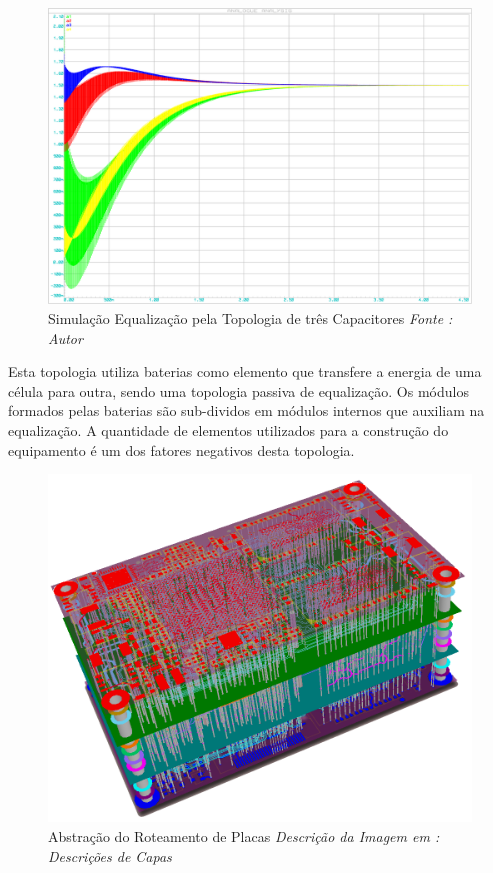 \documentclass[11pt, a4paper, oneside]{article}
\begin{document}
\begin{figure}[h!]
\centering
\includegraphics[width=1\linewidth]{diversos_capacitores}
\caption{Simulação Equalização pela Topologia de três Capacitores \textit{Fonte : Autor}}
\label{fig:estrutura_equalizador_passivo_ apacitor}
\end{figure}

Esta topologia utiliza baterias como elemento que transfere a energia de
uma célula para outra, sendo uma topologia passiva de equalização. Os módulos
formados pelas baterias são sub-dividos em módulos internos que auxiliam na
equalização. A quantidade de elementos utilizados para a construção do
equipamento é um dos fatores negativos desta topologia.

 	\newpage
	\thispagestyle{empty}
	\clearpage
	\begin{figure}
		\centering
		\includegraphics[width=1\linewidth]{capa5.png}
		\caption{Abstração do Roteamento de Placas \textit{Descrição da Imagem em : Descrições de Capas}}
		\label{fig:adc_dac_ideal}
	\end{figure}
	\clearpage
	\newpage
	
\end{document}
